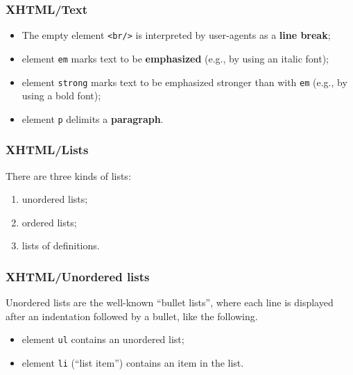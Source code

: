 %
\begin{frame}
\frametitle{XHTML/Text}

\begin{itemize}

  \item The empty element \texttt{<br/>} is interpreted by
    user-agents as a \textbf{line break};

  \item element \texttt{em} marks text to be \textbf{emphasized}
    (e.g., by using an italic font);

  \item element \texttt{strong} marks text to be emphasized stronger
    than with \texttt{em} (e.g., by using a bold font);

  \item element \texttt{p} delimits a \textbf{paragraph}.

\end{itemize}

\end{frame}

%
\begin{frame}
\frametitle{XHTML/Lists}

There are three kinds of lists:
\begin{enumerate}
 
  \item unordered lists;

  \item ordered lists;

  \item lists of definitions.

\end{enumerate}

\end{frame}

%
\begin{frame}
\frametitle{XHTML/Unordered lists}

Unordered lists are the well-known ``bullet lists'', where each
line is displayed after an indentation followed by a bullet, like the
following.
\begin{itemize}

  \item element \texttt{ul} contains an unordered list;

  \item element \texttt{li} (``list item'') contains an item in the
    list.

\end{itemize}

\end{frame}

